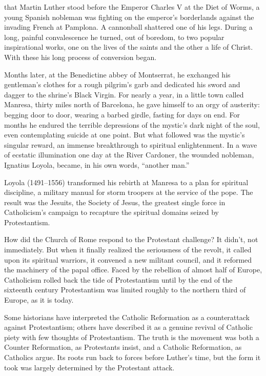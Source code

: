 
 that Martin Luther stood before the Emperor Charles V at the Diet of
Worms, a young Spanish nobleman was fighting on the emperor’s borderlands against the invading
French at Pamplona. A cannonball shattered one of his legs. During a long, painful convalescence he
turned, out of boredom, to two popular inspirational works, one on the lives of the saints and the
other a life of Christ. With these his long process of conversion began.

Months later, at the Benedictine abbey of Montserrat, he exchanged his gentleman’s clothes for a
rough pilgrim’s garb and dedicated his sword and dagger to the shrine’s Black Virgin. For nearly a
year, in a little town called Manresa, thirty miles north of Barcelona, he gave himself to an orgy
of austerity: begging door to door, wearing a barbed girdle, fasting for days on end. For months he
endured the terrible depressions of the mystic’s dark night of the soul, even contemplating suicide
at one point. But what followed was the mystic’s singular reward, an immense breakthrough to
spiritual enlightenment. In a wave of ecstatic illumination one day at the River Cardoner, the
wounded nobleman, Ignatius Loyola, became, in his own words, “another man.”

Loyola (1491–1556) transformed his rebirth at Manresa to a plan for spiritual discipline, a military
manual for storm troopers at the service of the pope. The result was the Jesuits, the Society of
Jesus, the greatest single force in Catholicism’s campaign to recapture the spiritual domains seized
by Protestantism.

How did the Church of Rome respond to the Protestant challenge? It didn’t, not immediately. But when
it finally realized the seriousness of the revolt, it called upon its spiritual warriors, it
convened a new militant council, and it reformed the machinery of the papal office. Faced by the
rebellion of almost half of Europe, Catholicism rolled back the tide of Protestantism until by the
end of the sixteenth century Protestantism was limited roughly to the northern third of Europe, as
it is today.

Some historians have interpreted the Catholic Reformation as a counterattack against Protestantism;
others have described it as a genuine revival of Catholic piety with few thoughts of Protestantism.
The truth is the movement was both a Counter Reformation, as Protestants insist, and a Catholic
Reformation, as Catholics argue. Its roots run back to forces before Luther’s time, but the form it
took was largely determined by the Protestant attack.

